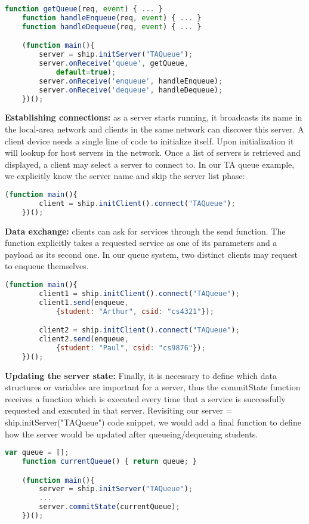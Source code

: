 \begin{lstlisting}[language=JavaScript]
    function getQueue(req, event) { ... }
    function handleEnqueue(req, event) { ... }
    function handleDequeue(req, event) { ... }

    (function main(){
        server = ship.initServer("TAQueue");
        server.onReceive('queue', getQueue, 
            default=true);
        server.onReceive('enqueue', handleEnqueue);
        server.onReceive('dequeue', handleDequeue);
    })();
\end{lstlisting}

{\bf Establishing connections: } as a server starts running, it broadcasts its name in the local-area network and clients in the same network can discover this server. A client device needs a single line of code to initialize itself. Upon initialization it will lookup for host servers in the network. Once a list of servers is retrieved and displayed, a client may select a server to connect to. In our TA queue example, we explicitly know the server name and skip the server list phase:

\begin{lstlisting}[language=JavaScript]
    (function main(){
        client = ship.initClient().connect("TAQueue");
    })();
\end{lstlisting}


{\bf Data exchange: } clients can ask for services through the {\ttfamily send} function. The function explicitly takes a requested service as one of its parameters and a payload as its second one. In our queue system, two distinct clients may request to enqueue themselves.

\begin{lstlisting}[language=JavaScript]
    (function main(){
        client1 = ship.initClient().connect("TAQueue");
        client1.send(enqueue, 
            {student: "Arthur", csid: "cs4321"});

        client2 = ship.initClient().connect("TAQueue");
        client2.send(enqueue, 
            {student: "Paul", csid: "cs9876"});
    })();
\end{lstlisting}

{\bf Updating the server state: } Finally, it is necessary to define which data structures or variables are important for a server, thus the {\ttfamily commitState} function receives a function which is executed every time that a service is successfully requested and executed in that server. Revisiting our {\ttfamily server = ship.initServer("TAQueue")} code snippet, we would add a final function to define how the server would be updated after queueing/dequeuing students.

\begin{lstlisting}[language=JavaScript]
    var queue = [];
    function currentQueue() { return queue; }

    (function main(){
        server = ship.initServer("TAQueue");
        ...
        server.commitState(currentQueue);
    })();
\end{lstlisting}
